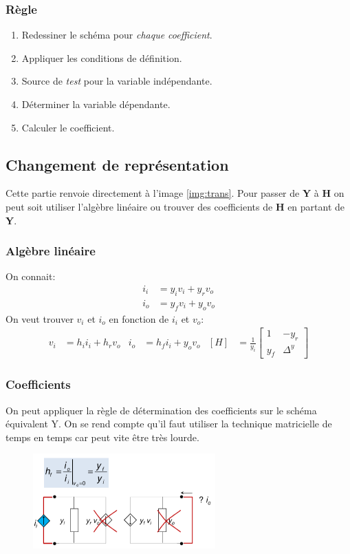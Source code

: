 \documentclass{report}
\begin{document}
\subsubsection{Règle}
\begin{enumerate}
\item Redessiner le schéma pour \textit{chaque coefficient}.
\item Appliquer les conditions de définition.
\item Source de \textit{test} pour la variable indépendante.
\item Déterminer la variable dépendante.
\item Calculer le coefficient.
\end{enumerate}

\subsection{Changement de représentation}
Cette partie renvoie directement à l'image \ref{img:trans}. Pour passer de \textbf{Y} à \textbf{H} on peut soit utiliser l'algèbre linéaire ou trouver des coefficients de \textbf{H} en partant de \textbf{Y}.

\subsubsection{Algèbre linéaire}
On connait:
\begin{align*}
i_i &= y_i v_i + y_r v_o\\
i_o &= y_f v_i + y_o v_o
\end{align*}
On veut trouver $v_i$ et $i_o$ en fonction de $i_i$ et $v_o$:
\begin{align*}
v_i &= h_i i_i + h_r v_o &
i_o &= h_f i_i + y_o v_o &
[H] &= \frac{1}{y_i} \begin{bmatrix}
1 & -y_r\\
y_f & \Delta^y
\end{bmatrix}
\end{align*}

\subsubsection{Coefficients}
On peut appliquer la règle de détermination des coefficients sur le schéma équivalent Y. On se rend compte qu'il faut utiliser la technique matricielle de temps en temps car peut vite être très lourde.
\begin{figure}[H]
\centering
\includegraphics[width=7cm]{img/HYcoeff.png}
\end{figure}
\end{document}
